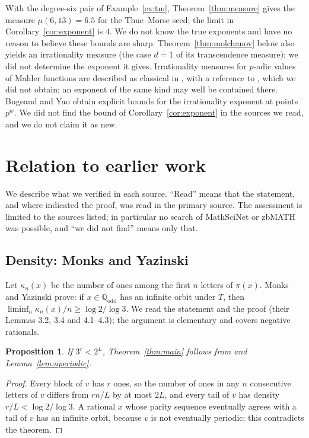 \documentclass[11pt,reqno]{amsart}
\newtheorem{proposition}[theorem]{Proposition}
\theoremstyle{definition}
\theoremstyle{remark}
\newcommand{\Qodd}{\mathbb{Q}_{\mathrm{odd}}}
\begin{document}
With the degree-six pair of Example~\ref{ex:tm}, Theorem~\ref{thm:measure}
gives the measure $\mu(6,13)=6.5$ for the Thue--Morse seed; the limit in
Corollary~\ref{cor:exponent} is $4$.  We do not know the true exponents and
have no reason to believe these bounds are sharp.  Theorem~\ref{thm:molchanov}
below also yields an irrationality measure (the case $d=1$ of its
transcendence measure); we did not determine the exponent it gives.
Irrationality measures for $p$-adic values of Mahler functions are
described as classical in \cite{Upstream}, with a reference to
\cite{LoxtonvdPoorten1982}, which we did not obtain; an exponent of the
same kind may well be contained there.  Bugeaud and Yao
\cite{BugeaudYao2017} obtain explicit bounds for the irrationality exponent
at points $p^{w}$.  We did not find the bound of
Corollary~\ref{cor:exponent} in the sources we read, and we do not claim
it as new.

\section{Relation to earlier work}\label{sec:prior}

We describe what we verified in each source.  ``Read'' means that the
statement, and where indicated the proof, was read in the primary source.
The assessment is limited to the sources listed; in particular no search of
MathSciNet or zbMATH was possible, and ``we did not find'' means only that.

\subsection{Density: Monks and Yazinski}
Let $\kappa_n(x)$ be the number of ones among the first $n$ letters of
$\pi(x)$.  Monks and Yazinski \cite[Theorem~2.7(b)]{MonksYazinski2004}
prove: if $x\in\Qodd$ has an infinite orbit under $T$, then
$\liminf_n\kappa_n(x)/n\ge\log 2/\log 3$.  We read the statement and the
proof (their Lemmas 3.2, 3.4 and 4.1--4.3); the argument is elementary and
covers negative rationals.

\begin{proposition}\label{prop:sub}
If $3^{r}<2^{L}$, Theorem~\ref{thm:main} follows from
\cite[Theorem~2.7(b)]{MonksYazinski2004} and Lemma~\ref{lem:aperiodic}.
\end{proposition}

\begin{proof}
Every block of $v$ has $r$ ones, so the number of ones in any $n$
consecutive letters of $v$ differs from $rn/L$ by at most $2L$, and every
tail of $v$ has density $r/L<\log 2/\log 3$.  A rational $x$ whose parity
sequence eventually agrees with a tail of $v$ has an infinite orbit,
because $v$ is not eventually periodic; this contradicts the theorem.
\end{proof}
\end{document}

